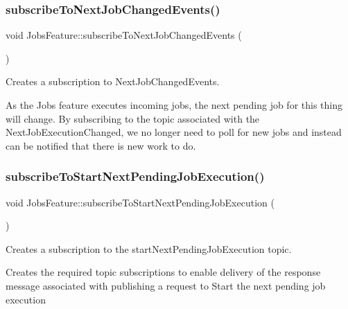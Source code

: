 \subsubsection{\texorpdfstring{subscribe\+To\+Next\+Job\+Changed\+Events()}{subscribeToNextJobChangedEvents()}}
{\footnotesize\ttfamily void Jobs\+Feature\+::subscribe\+To\+Next\+Job\+Changed\+Events (\begin{DoxyParamCaption}{ }\end{DoxyParamCaption})\hspace{0.3cm}{\ttfamily [private]}}



Creates a subscription to Next\+Job\+Changed\+Events. 

As the Jobs feature executes incoming jobs, the next pending job for this thing will change. By subscribing to the topic associated with the Next\+Job\+Execution\+Changed, we no longer need to poll for new jobs and instead can be notified that there is new work to do. \mbox{\label{class_aws_1_1_iot_1_1_device_client_1_1_jobs_1_1_jobs_feature_ab76653347635a003fda9e3748ee8d053}} 
\subsubsection{\texorpdfstring{subscribe\+To\+Start\+Next\+Pending\+Job\+Execution()}{subscribeToStartNextPendingJobExecution()}}
{\footnotesize\ttfamily void Jobs\+Feature\+::subscribe\+To\+Start\+Next\+Pending\+Job\+Execution (\begin{DoxyParamCaption}{ }\end{DoxyParamCaption})\hspace{0.3cm}{\ttfamily [private]}}



Creates a subscription to the start\+Next\+Pending\+Job\+Execution topic. 

Creates the required topic subscriptions to enable delivery of the response message associated with publishing a request to Start the next pending job execution \mbox{\label{class_aws_1_1_iot_1_1_device_client_1_1_jobs_1_1_jobs_feature_a15e9508e5eac303329646830223ce927}} 

